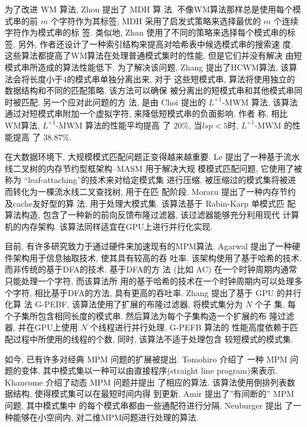 \documentclass{ws-ijprai}
\begin{document}
为了改进 \textsf{WM} 算法, Zhou \cite{Zhou2007} 提出了 \textsf{MDH} 算
法. 不像WM算法那样总是使用每个模式串的前 $m$ 个字符作为其标签,
\textsf{MDH} 采用了启发式策略来选择最优的 $m$ 个连续字符作为模式串的标
签. 类似地, Zhan \cite{Zhan2014} 使用了不同的策略来选择每个模式串的标
签, 另外, 作者还设计了一种索引结构来提高对哈希表中候选模式串的搜索速
度. 这些算法都提高了WM算法在处理普通模式集时的性能, 但是它们并没有解决
由短模式串所造成的算法性能低下. 为了解决该问题, Zhang \cite{Zhang2009}
提出了\textsf{HCWM}算法, 该算法会将长度小于4的模式串单独分离出来, 对于
这些短模式串, 算法将使用独立的数据结构和不同的匹配策略. 该方法可以确保
被分离出的短模式串和其他模式串同时被匹配. 另一个应对此问题的方
法, 是由 Choi \cite{Choi2011} 提出的 \textsf{$L^{+1}$-MWM} 算法, 该算法
通过对短模式串附加一个虚拟字符, 来降低短模式串的负面影响. 作者
称, 相比WM算法, \textsf{$L^{+1}$-MWM} 算法的性能平均提高
了 $20\%$, 当$lsp < 5$时, \textsf{$L^{+1}$-MWM} 的性能提高
了 $38.87\%$.


在大数据环境下, 大规模模式匹配问题正变得越来越重要. Le \cite{Le2013}
提出了一种基于流水线二叉树的内存节约型框架构--\textsf{MASM} 用于解决大规
模模式匹配问题, 它使用了被称为 ``leaf-attaching''的技术来对给定模式集
进行压缩, 被压缩过的模式集将被进而转化为一棵流水线二叉查找树, 用于在匹
配阶段. Moraru \cite{Moraru2012} 提出了一种内存节约及cache友好型的算
法, 用于处理大模式集. 该算法基于 Rabin-Karp \cite{Karp1987} 单模式匹
配算法构造, 包含了一种新的前向反馈布隆过滤器, 该过滤器能够充分利用现代
计算机的内存架构. 该算法同样适宜在GPU上进行并行化实现.

目前, 有许多研究致力于通过硬件来加速现有的MPM算法. Agarwal
\cite{Agarwal2013} 提出了一种硬件架构用于信息抽取技术, 使其具有较高的吞
吐率. 该架构使用了基于哈希的技术, 而非传统的基于DFA的技术. 基于DFA的方
法 (比如 \textsf{AC}) 在一个时钟周期内通常只能处理一个字符, 而该算法所
用的基于哈希的技术在一个时钟周期内可以处理多个字符, 相比基于DFA的方法,
具有更高的吞吐率. Zhang \cite{Zhang2015} 提出了基于 GPU 的并行化算
法 \textsf{G-PEBF}, 该算法使用了扩展的布隆过滤器, 将模式集分为 $N$ 个子
集, 每个子集所包含相同长度的模式串. 然后算法为每个子集构造一个扩展的布
隆过滤器, 并在GPU上使用 $N$ 个线程进行并行处理. \textsf{G-PEFB} 算法的
性能高度依赖于匹配过程中所使用的线程的个数, 同时, 该算法不适于处理包含
较短模式的模式集.

如今, 已有许多对经典 MPM 问题的扩展被提出. Tomohiro \cite{I2015} 介绍了
一种 MPM 问题的变体, 其中模式集以一种可以由直接程序(straight line
program)来表示.  Khancome \cite{Khancome2013} 介绍了动态 MPM 问题并提出
了相应的算法. 该算法使用倒排列表数据结构, 使得模式集可以在最短时间内得
到更新. Amir \cite{Amir2015} 提出了''有间断的'' MPM 问题, 其中模式集中
的每个模式串都由一些通配符进行分隔. Neuburger \cite{Neuburger2012} 提出
了一种能够在小空间内, 对二维MPM问题进行处理的算法.
\end{document}
